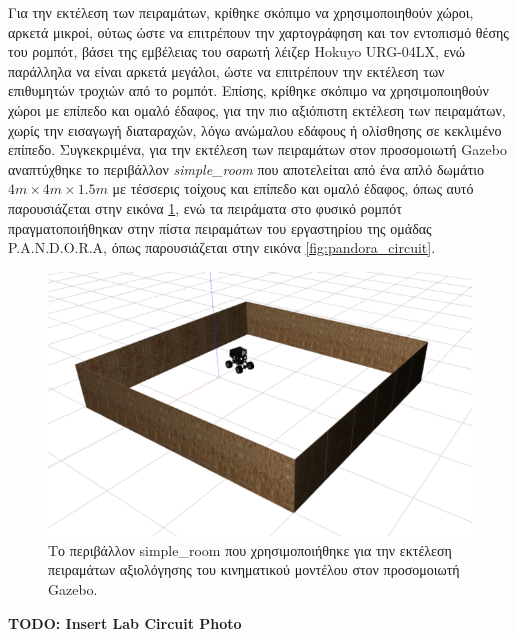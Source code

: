 \bigskip
Για την εκτέλεση των πειραμάτων, κρίθηκε σκόπιμο να χρησιμοποιηθούν χώροι, αρκετά μικροί, ούτως ώστε να επιτρέπουν την χαρτογράφηση και τον εντοπισμό θέσης του ρομπότ, βάσει της εμβέλειας του σαρωτή λέιζερ Hokuyo URG-04LX, ενώ παράλληλα να είναι αρκετά μεγάλοι, ώστε να επιτρέπουν την εκτέλεση των επιθυμητών τροχιών από το ρομπότ. Επίσης, κρίθηκε σκόπιμο να χρησιμοποιηθούν χώροι με επίπεδο και ομαλό έδαφος, για την πιο αξιόπιστη εκτέλεση των πειραμάτων, χωρίς την εισαγωγή διαταραχών, λόγω ανώμαλου εδάφους ή ολίσθησης σε κεκλιμένο επίπεδο. Συγκεκριμένα, για την εκτέλεση των πειραμάτων στον προσομοιωτή Gazebo αναπτύχθηκε το περιβάλλον \textit{simple{\_}room} που αποτελείται από ένα απλό δωμάτιο $4m \times 4m \times 1.5m$ με τέσσερις τοίχους και επίπεδο και ομαλό έδαφος, όπως αυτό παρουσιάζεται στην εικόνα \ref{fig:simple_room}, ενώ τα πειράματα στο φυσικό ρομπότ πραγματοποιήθηκαν στην πίστα πειραμάτων του εργαστηρίου της ομάδας P.A.N.D.O.R.A, όπως παρουσιάζεται στην εικόνα \ref{fig:pandora_circuit}.

\begin{figure}[!ht]
	\centering
	\includegraphics[width=\linewidth]{Chapters/Chapter5/Figures/simple_room.png}
	\caption{Το περιβάλλον simple{\_}room που χρησιμοποιήθηκε για την εκτέλεση πειραμάτων  αξιολόγησης του κινηματικού μοντέλου στον προσομοιωτή Gazebo.}
	\label{fig:simple_room}
\end{figure}

\textbf{TODO: Insert Lab Circuit Photo} 



